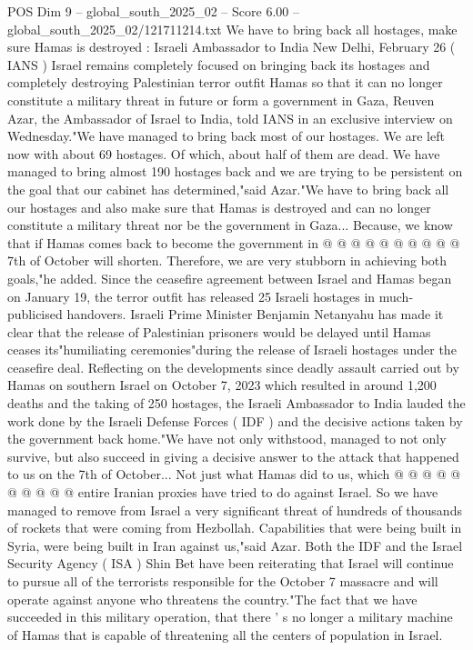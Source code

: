\begin{textsample}{POS Dim 9 – global\_south\_2025\_02 – Score 6.00 – global\_south\_2025\_02/121711214.txt}  \label{ex:f9_pos_391}
We have to bring back all hostages, make sure Hamas is destroyed : Israeli Ambassador to India New Delhi, February 26 ( IANS ) Israel remains completely focused on bringing back its hostages and completely destroying Palestinian terror outfit Hamas so that it can no longer constitute a military threat in future or form a government in Gaza, Reuven Azar, the Ambassador of Israel to India, told IANS in an exclusive interview on Wednesday."We have managed to bring back most of our hostages.
We are left now with about 69 hostages.
Of which, about half of them are dead.
We have managed to bring almost 190 hostages back and we are trying to be persistent on the goal that our cabinet has determined,"said Azar."We have to bring back all our hostages and also make sure that Hamas is destroyed and can no longer constitute a military threat nor be the government in Gaza...
Because, we know that if Hamas comes back to become the government in @ @ @ @ @ @ @ @ @ @ 7th of October will shorten.
Therefore, we are very stubborn in achieving both goals,"he added.
Since the ceasefire agreement between Israel and Hamas began on January 19, the terror outfit has released 25 Israeli hostages in much-publicised handovers.
Israeli Prime Minister Benjamin Netanyahu has made it clear that the release of Palestinian prisoners would be delayed until Hamas ceases its"humiliating ceremonies"during the release of Israeli hostages under the ceasefire deal.
Reflecting on the developments since deadly assault carried out by Hamas on southern Israel on October 7, 2023 which resulted in around 1,200 deaths and the taking of 250 hostages, the Israeli Ambassador to India lauded the work done by the Israeli Defense Forces ( IDF ) and the decisive actions taken by the government back home."We have not only withstood, managed to not only survive, but also succeed in giving a decisive answer to the attack that happened to us on the 7th of October...
Not just what Hamas did to us, which @ @ @ @ @ @ @ @ @ @ entire Iranian proxies have tried to do against Israel.
So we have managed to remove from Israel a very significant threat of hundreds of thousands of rockets that were coming from Hezbollah.
Capabilities that were being built in Syria, were being built in Iran against us,"said Azar.
Both the IDF and the Israel Security Agency ( ISA ) Shin Bet have been reiterating that Israel will continue to pursue all of the terrorists responsible for the October 7 massacre and will operate against anyone who threatens the country."The fact that we have succeeded in this military operation, that there ' s no longer a military machine of Hamas that is capable of threatening all the centers of population in Israel.

\end{textsample}
